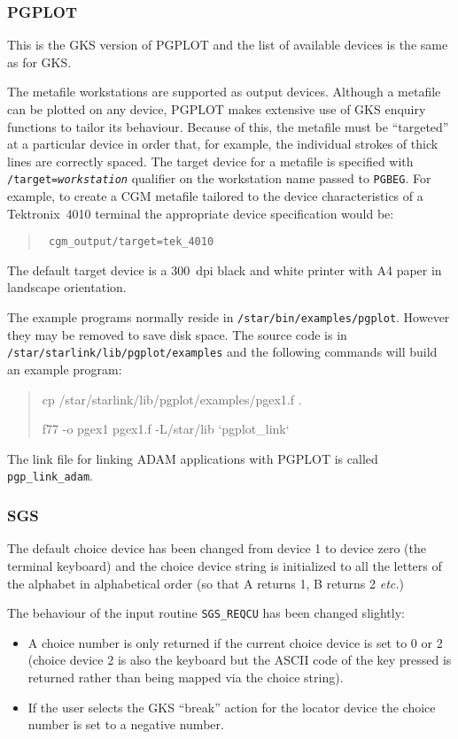\subsubsection{PGPLOT}

This is the GKS version of PGPLOT and the list of available devices is the same
as for GKS.

The metafile workstations are supported as output devices. Although a
metafile can be plotted on any device, PGPLOT makes extensive use of GKS
enquiry functions to tailor its behaviour. Because of this, the metafile
must be
``targeted'' at a particular device in order that, for example, the individual
strokes of thick lines are correctly spaced. The target device for a metafile
is specified with {\tt /target={\em workstation\/}} qualifier on the workstation
name passed to {\tt PGBEG}. For example, to create a CGM metafile tailored to
the device characteristics of a Tektronix~4010 terminal the appropriate device
specification would be:
\begin{quote}\tt
cgm\_output/target=tek\_4010
\end{quote}
The default target device is a 300~dpi black and white printer with A4 paper in
landscape orientation.

The example programs normally reside in {\tt /star/bin/examples/pgplot}.
However they may be
removed to save disk space. The source code is in {\tt
/star/starlink/lib/pgplot/examples} and the following commands will build an
example program:

\begin{quote}\tt

cp /star/starlink/lib/pgplot/examples/pgex1.f .

f77 -o pgex1 pgex1.f -L/star/lib `pgplot\_link`

\end{quote}

The link file for linking ADAM applications with PGPLOT is called {\tt
pgp\_link\_adam}.

\subsubsection{SGS}

The default choice device has been changed from device 1 to device zero (the
terminal keyboard) and the choice device string is initialized to all the
letters of the alphabet in alphabetical order (so that A returns 1, B returns
2 {\it etc.})

The behaviour of the input routine {\tt SGS\_REQCU} has been changed slightly:
\begin{itemize}
\item A choice number is only returned if the current choice device is set to 0
or 2 (choice device 2 is also the keyboard but the ASCII code of the key
pressed is returned rather than being mapped via the choice string).
\item If the user selects the GKS ``break'' action for the locator device
the choice number is set to a negative number.
\end{itemize}

